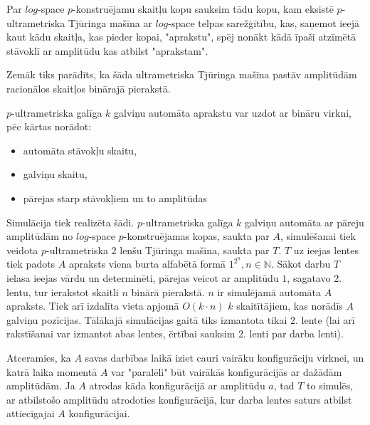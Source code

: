 \documentclass{ludis}
\begin{document}
\begin{definicija}
Par $log$-space $p$-konstruējamu skaitļu kopu sauksim tādu kopu, kam eksistē $p$-ultrametriska Tjūringa mašīna ar $log$-space telpas sarežģītību, kas, saņemot ieejā kaut kādu skaitļa, kas pieder kopai, "aprakstu", spēj nonākt kādā īpaši atzīmētā stāvoklī ar amplitūdu kas atbilst "aprakstam".
\end{definicija}

Zemāk tiks parādīts, ka šāda ultrametriska Tjūringa mašīna pastāv amplitūdām racionālos skaitļos binārajā pierakstā.

$p$-ultrametriska galīga $k$ galviņu automāta aprakstu var uzdot ar bināru virkni, pēc kārtas norādot:
\begin{itemize}
	\item automāta stāvokļu skaitu,
	\item galviņu skaitu,
	\item pārejas starp stāvokļiem un to amplitūdas %
\end{itemize}

Simulācija tiek realizēta šādi. $p$-ultrametriska galīga $k$ galviņu automāta ar pāreju amplitūdām no $log$-space $p$-konstruējamas kopas, saukta par $A$, simulēšanai tiek veidota $p$-ultrametriska $2$ lenšu Tjūringa mašīna, saukta par $T$. $T$ uz ieejas lentes tiek padots $A$ apraksts viena burta alfabētā formā $1^{2^n}, n \in \mathbb{N}$. Sākot darbu $T$ ielasa ieejas vārdu un determinēti, pārejas veicot ar amplitūdu $1$, sagatavo 2. lentu, tur ierakstot skaitli $n$ binārā pierakstā. $n$ ir simulējamā automāta $A$ apraksts. Tiek arī izdalīta vieta apjomā $O(k \cdot n)$ $k$ skaitītājiem, kas norādīs $A$ galviņu pozīcijas. Tālākajā simulācijas gaitā tiks izmantota tikai 2. lente (lai arī rakstīšanai var izmantot abas lentes, ērtībai sauksim 2. lenti par darba lenti).

Atceramies, ka $A$ savas darbības laikā iziet cauri vairāku konfigurāciju virknei, un katrā laika momentā $A$ var "paralēli" būt vairākās konfigurācijās ar dažādām amplitūdām.
Ja $A$ atrodas kāda konfigurācijā ar amplitūdu $a$, tad $T$ to simulēs, ar atbilstošo amplitūdu atrodoties konfigurācijā, kur darba lentes saturs atbilst attiecīgajai $A$ konfigurācijai.
\end{document}
